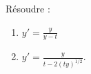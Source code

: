 

\begin{exercice}\label{exo_II-1-10}

Résoudre :
\begin{enumerate}
\item $y'=\frac{ y }{ y-t }$
\item $y'=\frac{ y }{ t-2(ty)^{1/2} }$.
\end{enumerate}

\end{exercice}

